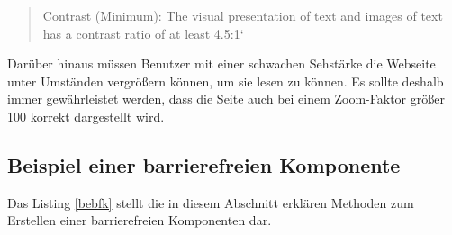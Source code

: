 \begin{quote}
Contrast (Minimum): The visual presentation of text and images of text has a contrast ratio of at least 4.5:1` \cite{citeulike:13915310}
\end{quote}

Darüber hinaus müssen Benutzer mit einer schwachen Sehstärke die Webseite unter Umständen vergrößern können, um sie lesen zu können. Es sollte deshalb immer gewährleistet werden, dass die Seite auch bei einem Zoom-Faktor größer 100 korrekt dargestellt wird.


\subsection{Beispiel einer barrierefreien Komponente}\label{beispiel-einer-barrierefreien-komponente}

Das Listing \ref{bebfk} stellt die in diesem Abschnitt erklären Methoden zum Erstellen einer barrierefreien Komponenten dar.


